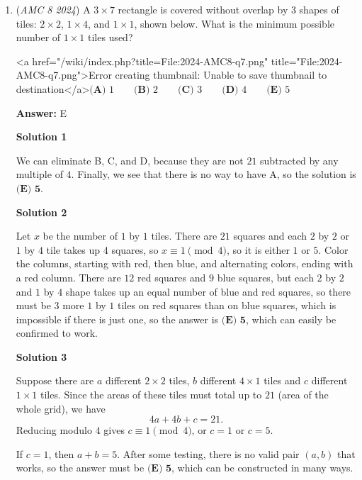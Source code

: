 \begin{enumerate}
 Youtube Link ⬇️

 


	\item (\textit{AMC 8 2024}) A $3\times 7$ rectangle is covered without overlap by 3 shapes of tiles: $2\times 2$, $1\times 4$, and $1\times 1$, shown below. What is the minimum possible number of $1\times 1$ tiles used?


 <a href="/wiki/index.php?title=File:2024-AMC8-q7.png" title="File:2024-AMC8-q7.png">Error creating thumbnail: Unable to save thumbnail to destination</a>$\textbf{(A) } 1\qquad\textbf{(B) } 2\qquad\textbf{(C) } 3\qquad\textbf{(D) } 4\qquad\textbf{(E) } 5$

 \textbf{Answer: }E



\textbf{Solution 1}

We can eliminate B, C, and D, because they are not $21$ subtracted by any multiple of $4$. Finally, we see that there is no way to have A, so the solution is $\boxed{\textbf{(E)\ 5}}$.

 



\textbf{Solution 2}

Let $x$ be the number of $1$ by $1$ tiles. There are $21$ squares and each $2$ by $2$ or $1$ by $4$ tile takes up 4 squares, so $x \equiv 1 \pmod{4}$, so it is either $1$ or $5$. Color the columns, starting with red, then blue, and alternating colors, ending with a red column. There are $12$ red squares and $9$ blue squares, but each $2$ by $2$ and $1$ by $4$ shape takes up an equal number of blue and red squares, so there must be $3$ more $1$ by $1$ tiles on red squares than on blue squares, which is impossible if there is just one, so the answer is $\boxed{\textbf{(E)\ 5}}$, which can easily be confirmed to work.

 



\textbf{Solution 3}

Suppose there are $a$ different $2\times 2$ tiles, $b$ different $4\times 1$ tiles and $c$ different $1\times 1$ tiles. Since the areas of these tiles must total up to $21$ (area of the whole grid), we have 
 \[4a + 4b + c = 21.\]Reducing modulo $4$ gives $c\equiv 1\pmod{4}$, or $c = 1$ or $c = 5$. 

 If $c = 1$, then $a + b = 5$. After some testing, there is no valid pair $(a, b)$ that works, so the answer must be $\boxed{\textbf{(E)\ 5}}$, which can be constructed in many ways. 


\end{enumerate}
